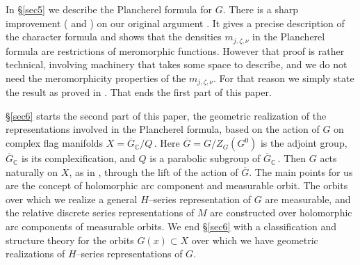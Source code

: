 \documentclass{conm-p-l}
\def\C{\mathbb{C}}
\begin{document}
In \S \ref{sec5} we describe the Plancherel formula for $G$.   There is a 
sharp improvement (\cite{HW1986a} and \cite{HW1986b}) on our original argument
\cite[\S 5]{W1973}.  It gives a precise description of the character formula
and shows that the densities $m_{j,\zeta,\nu}$ in the Plancherel formula are 
restrictions of meromorphic functions.  However that proof is rather technical,
involving machinery that takes some space to describe, and we do not need the
meromorphicity properties of the $m_{j,\zeta,\nu}$.  For that reason we
simply state the result as proved in \cite[\S 5]{W1973}.
That ends the first part of this paper.

\S \ref{sec6} starts the second part of this paper, the geometric realization of
the representations involved in the Plancherel formula, based on the action
of $G$ on complex flag manifolds $X = \overline{G}_\C/Q$\,.  Here $\overline{G}
= G/Z_G(G^0)$ is the adjoint group, $\overline{G}_\C$ is its complexification,
and $Q$ is a parabolic subgroup of $\overline{G}_\C$\,.  Then $G$ acts naturally
on $X$, as in \cite{W1969}, through the lift of the action of $\overline{G}$.
The main points for us are the concept of holomorphic arc component and
measurable orbit.  The orbits over which we realize a general $H$--series
representation of $G$ are measurable, and the relative discrete series
representations of $M$ are constructed over holomorphic arc components of
measurable orbits.  We end \S \ref{sec6} with a classification and structure theory
for the orbits $G(x) \subset X$ over which we have geometric realizations
of $H$--series representations of $G$.
\end{document}
